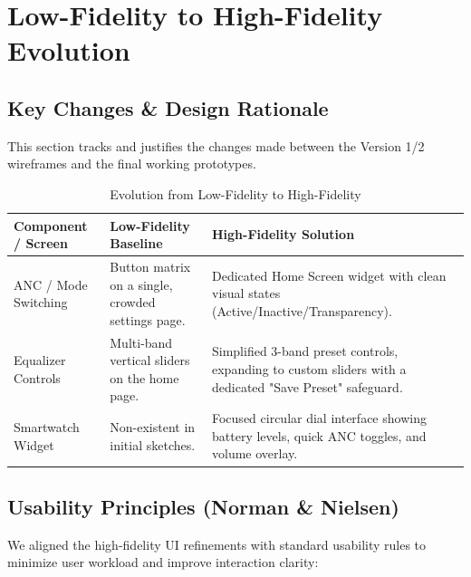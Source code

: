 \documentclass[12pt, a4paper]{report}
\begin{document}
\chapter{Low-Fidelity to High-Fidelity Evolution}

\section{Key Changes \& Design Rationale}
This section tracks and justifies the changes made between the Version 1/2 wireframes and the final working prototypes.

\begin{table}[H]
  \centering
  \caption{Evolution from Low-Fidelity to High-Fidelity}
  \begin{tabularx}{\linewidth}{p{3.5cm} p{5.5cm} p{5.5cm}}
    \toprule
    \textbf{Component / Screen} & \textbf{Low-Fidelity Baseline} & \textbf{High-Fidelity Solution} \\
    \midrule
    ANC / Mode Switching & Button matrix on a single, crowded settings page. & Dedicated Home Screen widget with clean visual states (Active/Inactive/Transparency). \\
    \midrule
    Equalizer Controls & Multi-band vertical sliders on the home page. & Simplified 3-band preset controls, expanding to custom sliders with a dedicated "Save Preset" safeguard. \\
    \midrule
    Smartwatch Widget & Non-existent in initial sketches. & Focused circular dial interface showing battery levels, quick ANC toggles, and volume overlay. \\
    \bottomrule
  \end{tabularx}
  \label{tab:evolution}
\end{table}

\section{Usability Principles (Norman \& Nielsen)}
We aligned the high-fidelity UI refinements with standard usability rules to minimize user workload and improve interaction clarity:
\end{document}
